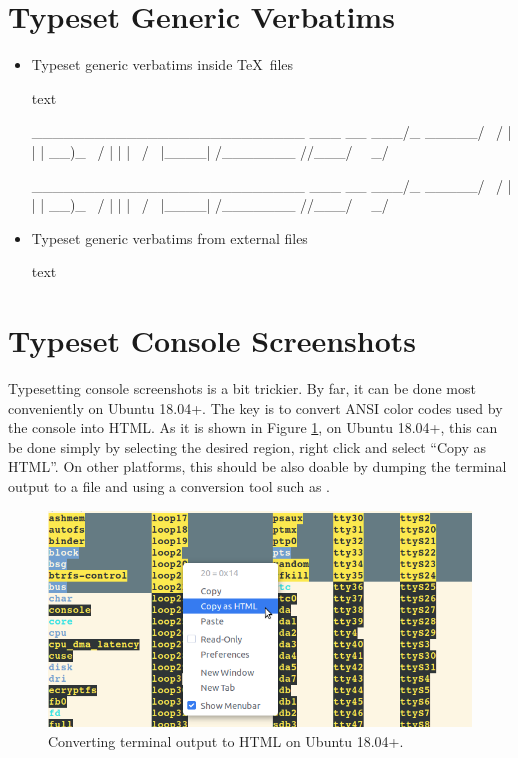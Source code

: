 \documentclass[letterpaper, 11pt, DIV=11]{scrartcl}
\begin{document}
\section{Typeset Generic Verbatims}

\begin{itemize}
\item Typeset generic verbatims inside \TeX\ files

\begin{tcbsrccode}{text}
\begin{tcbverbatim}
__________________________  ___
\__    ___/\_   _____/\   \/  /
  |    |    |    __)_  \     / 
  |    |    |        \ /     \ 
  |____|   /_______  //___/\  \
                   \/       \_/
\end{tcbverbatim}
\end{tcbsrccode}
\begin{tcbverbatim}
__________________________  ___
\__    ___/\_   _____/\   \/  /
  |    |    |    __)_  \     / 
  |    |    |        \ /     \ 
  |____|   /_______  //___/\  \
                   \/       \_/
\end{tcbverbatim}


\item Typeset generic verbatims from external files

\begin{tcbsrccode}{text}
\end{tcbsrccode}

\end{itemize}


\section{Typeset Console Screenshots}

Typesetting console screenshots is a bit trickier. By far, it can be done most conveniently on Ubuntu 18.04+. The key is to convert ANSI color codes used by the console into HTML. As it is shown in Figure \ref{fig:ubuntu-conv}, on Ubuntu 18.04+, this can be done simply by selecting the desired region, right click and select ``Copy as HTML''. On other platforms, this should be also doable by dumping the terminal output to a file and using a conversion tool such as \href{https://pypi.org/project/ansi2html/}{}.

\begin{figure}[htpb]
\centering
\includegraphics[width=0.6\linewidth]{../res/ubuntu-html}
\caption{Converting terminal output to HTML on Ubuntu 18.04+.}
\label{fig:ubuntu-conv}
\end{figure} 
\end{document}
